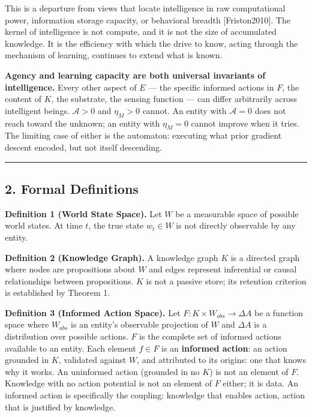 \documentclass[
]{article}
\begin{document}
This is a departure from views that locate intelligence in raw
computational power, information storage capacity, or behavioral breadth
{[}Friston2010{]}. The kernel of intelligence is not compute, and it is
not the size of accumulated knowledge. It is the efficiency with which
the drive to know, acting through the mechanism of learning, continues
to extend what is known.

\textbf{Agency and learning capacity are both universal invariants of
intelligence.} Every other aspect of \(E\) --- the specific informed
actions in \(F\), the content of \(K\), the substrate, the sensing
function --- can differ arbitrarily across intelligent beings.
\(\mathcal{A} > 0\) and \(\eta_M > 0\) cannot. An entity with
\(\mathcal{A} = 0\) does not reach toward the unknown; an entity with
\(\eta_M = 0\) cannot improve when it tries. The limiting case of either
is the automaton: executing what prior gradient descent encoded, but not
itself descending.

\begin{center}\rule{0.5\linewidth}{0.5pt}\end{center}

\subsection{2. Formal Definitions}\label{formal-definitions}

\textbf{Definition 1 (World State Space).} Let \(W\) be a measurable
space of possible world states. At time \(t\), the true state
\(w_t \in W\) is not directly observable by any entity.

\textbf{Definition 2 (Knowledge Graph).} A knowledge graph \(K\) is a
directed graph where nodes are propositions about \(W\) and edges
represent inferential or causal relationships between propositions.
\(K\) is not a passive store; its retention criterion is established by
Theorem 1.

\textbf{Definition 3 (Informed Action Space).} Let
\(F : K \times W_{obs} \rightarrow \Delta A\) be a function space where
\(W_{obs}\) is an entity's observable projection of \(W\) and
\(\Delta A\) is a distribution over possible actions. \(F\) is the
complete set of informed actions available to an entity. Each element
\(f \in F\) is an \textbf{informed action}: an action grounded in \(K\),
validated against \(W\), and attributed to its origins: one that knows
why it works. An uninformed action (grounded in no \(K\)) is not an
element of \(F\). Knowledge with no action potential is not an element
of \(F\) either; it is data. An informed action is specifically the
coupling: knowledge that enables action, action that is justified by
knowledge.
\end{document}
